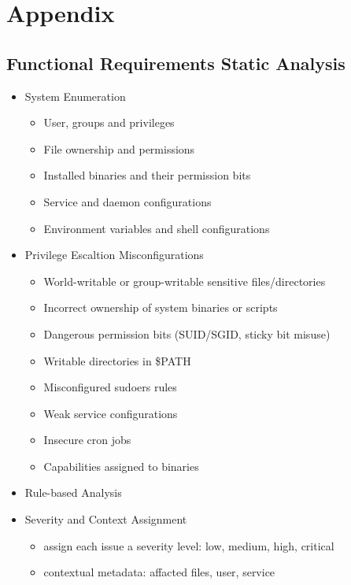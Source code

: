 \section{Appendix}

\subsection{Functional Requirements Static Analysis}
\label{sec:a_frs}

\begin{itemize}
	\item System Enumeration
	\begin{itemize}
		\item User, groups and privileges
		\item File ownership and permissions
		\item Installed binaries and their permission bits
		\item Service and daemon configurations
		\item Environment variables and shell configurations
	\end{itemize}
	\item Privilege Escaltion Misconfigurations
	\begin{itemize}
		\item World-writable or group-writable sensitive files/directories
		\item Incorrect ownership of system binaries or scripts
		\item Dangerous permission bits (SUID/SGID, sticky bit misuse)
		\item Writable directories in \$PATH
		\item Misconfigured sudoers rules
		\item Weak service configurations
		\item Insecure cron jobs
		\item Capabilities assigned to binaries
	\end{itemize}
	\item Rule-based Analysis
	\item Severity and Context Assignment
	\begin{itemize}
		\item assign each issue a severity level: low, medium, high, critical
		\item contextual metadata: affacted files, user, service
	\end{itemize}
\end{itemize}

